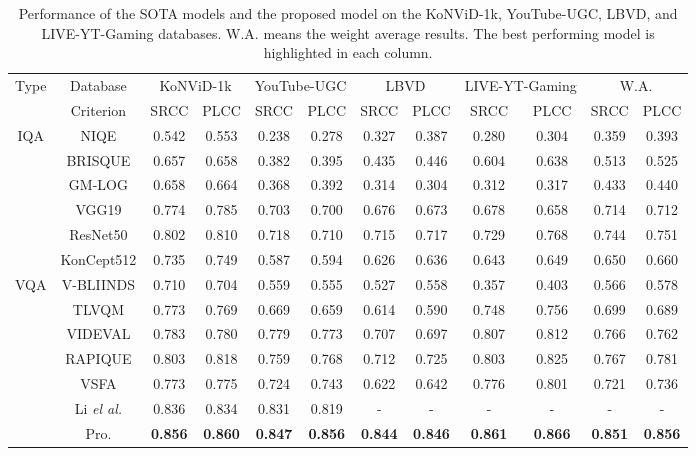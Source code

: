 \documentclass[sigconf]{acmart}
\begin{document}
\begin{table*}
\centering
\renewcommand{\arraystretch}{1}
\caption{Performance of the SOTA models and the proposed model on the KoNViD-1k, YouTube-UGC, LBVD, and LIVE-YT-Gaming databases. W.A. means the weight average results. The best performing model is highlighted in each column.}
\label{performance}
\begin{tabular}{c|c|cc|cc|cc|cc|cc}
\toprule[.15em]
\multirow{2}{*}{Type} & Database & \multicolumn{2}{c|}{KoNViD-1k} & \multicolumn{2}{c|}{YouTube-UGC} & \multicolumn{2}{c|}{LBVD} & \multicolumn{2}{c|}{LIVE-YT-Gaming} & \multicolumn{2}{c}{W.A.}\\
 & Criterion & SRCC & PLCC & SRCC & PLCC & SRCC & PLCC & SRCC & PLCC& SRCC & PLCC \\
\hline
\multirow{6}{*}{IQA}&NIQE & 0.542 & 0.553& 0.238& 0.278& 0.327& 0.387 & 0.280& 0.304& 0.359 & 0.393 \\
&BRISQUE & 0.657& 0.658& 0.382& 0.395& 0.435& 0.446& 0.604&0.638 & 0.513 &0.525 \\
&GM-LOG  & 0.658& 0.664& 0.368& 0.392& 0.314& 0.304& 0.312& 0.317& 0.433 &0.440 \\
&VGG19 & 0.774& 0.785& 0.703& 0.700& 0.676& 0.673& 0.678&0.658 & 0.714 &0.712 \\
&ResNet50 & 0.802& 0.810& 0.718& 0.710& 0.715& 0.717& 0.729& 0.768& 0.744 &0.751 \\
&KonCept512 & 0.735& 0.749& 0.587& 0.594& 0.626& 0.636& 0.643&0.649 & 0.650 &0.660 \\
\hline
\multirow{6}{*}{VQA}&V-BLIINDS  & 0.710& 0.704& 0.559& 0.555& 0.527& 0.558& 0.357& 0.403& 0.566 &0.578 \\
& TLVQM& 0.773& 0.769& 0.669& 0.659& 0.614& 0.590& 0.748& 0.756&  0.699 & 0.689 \\
&VIDEVAL & 0.783& 0.780& 0.779& 0.773& 0.707& 0.697& 0.807& 0.812& 0.766 &0.762 \\
&RAPIQUE & 0.803& 0.818& 0.759& 0.768& 0.712& 0.725& 0.803&0.825 & 0.767 &0.781 \\
&VSFA & 0.773& 0.775& 0.724& 0.743& 0.622& 0.642& 0.776&0.801& 0.721 &0.736  \\
&Li \textit{el al.} & 0.836& 0.834& 0.831& 0.819& -& -& -&- &- &-\\
& Pro. & \textbf{0.856} & \textbf{0.860}& \textbf{0.847} & \textbf{0.856} & \textbf{0.844}& \textbf{0.846}& \textbf{0.861} & \textbf{0.866} & \textbf{0.851}&\textbf{0.856} \\
\bottomrule[.15em]
\end{tabular}
\end{table*}
\end{document}

